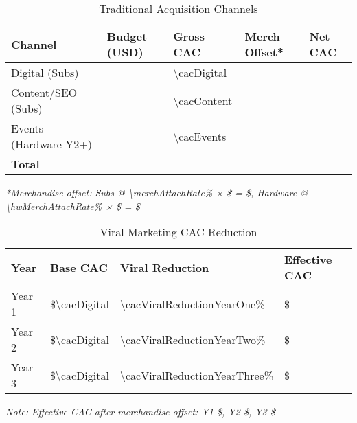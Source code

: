 \begin{table}[H]
\centering
\caption{Traditional Acquisition Channels}
\begin{tabularx}{\linewidth}{l Y Y Y Y}
\toprule
Channel & Budget (USD) & Gross CAC\cite{authoranalysis2024} & Merch Offset* & Net CAC \\\midrule
Digital (Subs) & \numint{\budgetDigital} & \num{\cacDigital} & \numfpeval{\merchOffsetSubsCalc} & \numfpeval{\cacDigital - \merchOffsetSubsCalc} \\
Content/SEO (Subs) & \numint{\budgetContent} & \num{\cacContent} & \numfpeval{\merchOffsetSubsCalc} & \numfpeval{\cacContent - \merchOffsetSubsCalc} \\
Events (Hardware Y2+) & \numint{\budgetEvents} & \num{\cacEvents} & \numfpeval{\merchOffsetHwCalc} & \numfpeval{\cacEvents - \merchOffsetHwCalc} \\\midrule
\textbf{Total} & \textbf{} &  &  &  \\
\bottomrule
\end{tabularx}
\end{table}
\textit{*Merchandise offset: Subs @ \num{\merchAttachRate}\% × \$\numfpeval{\merchAvgProfit} = \$\numfpeval{\merchOffsetSubsCalc}, Hardware @ \num{\hwMerchAttachRate}\% × \$\numfpeval{\merchAvgProfit} = \$\numfpeval{\merchOffsetHwCalc}}

\begin{table}[H]
\centering
\caption{Viral Marketing CAC Reduction}
\begin{tabularx}{\linewidth}{l Y Y Y}
\toprule
Year & Base CAC & Viral Reduction\cite{cbinsights2021} & Effective CAC \\\midrule
Year 1 & \$\num{\cacDigital} & \num{\cacViralReductionYearOne}\% & \$\numfpeval{\effectiveCACYearOne} \\
Year 2 & \$\num{\cacDigital} & \num{\cacViralReductionYearTwo}\% & \$\numfpeval{\effectiveCACYearTwo} \\
Year 3 & \$\num{\cacDigital} & \num{\cacViralReductionYearThree}\% & \$\numfpeval{\effectiveCACYearThree} \\
\bottomrule
\end{tabularx}
\end{table}
\textit{Note: Effective CAC after merchandise offset: Y1 \$\numfpeval{\effectiveCACYearOne - \merchOffsetSubsCalc}, Y2 \$\numfpeval{\effectiveCACYearTwo - \merchOffsetSubsCalc}, Y3 \$\numfpeval{\effectiveCACYearThree - \merchOffsetSubsCalc}}